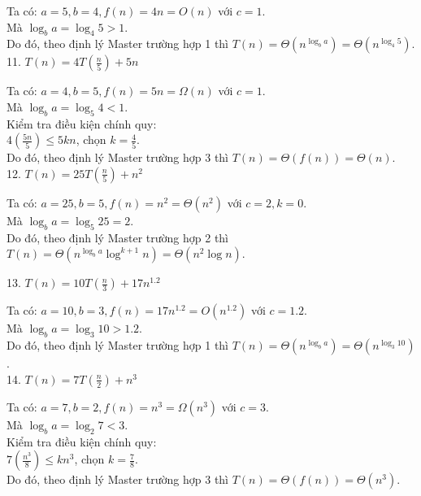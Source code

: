 \documentclass[12pt, a4paper, fleqn]{article}
\begin{document}
		Ta có: $a = 5, b = 4, f(n) = 4n = O (n)$ với $c = 1$.\\
		Mà $\log_{b} a = \log_{4} 5 > 1$.\\
		Do đó, theo định lý Master trường hợp 1 thì $T(n) = \Theta \left( n^{\log_{b} a} \right) = \Theta (n^{\log_{4} 5})$.
		\\
		
		11. $\displaystyle
		T(n) = 4T\left( \frac{n}{5} \right) + 5n$
		
		Ta có: $a = 4, b = 5, f(n) = 5n = \Omega (n)$ với $c = 1$.\\
		Mà $\log_{b} a = \log_{5} 4 < 1$.\\
		Kiểm tra điều kiện chính quy:\\
		$\displaystyle
		4 \left( \frac{5n}{5} \right) \leq 5kn$, chọn $\displaystyle
		k = \frac{4}{5}$.\\
		Do đó, theo định lý Master trường hợp 3 thì $T(n) = \Theta (f(n)) = \Theta (n)$.
		\\
		
		12. $\displaystyle
		T(n) = 25T\left( \frac{n}{5} \right) + n^2$
		
		Ta có: $a = 25, b = 5, f(n) = n^2 = \Theta (n^2)$ với $c = 2, k = 0$.\\
		Mà $\log_{b} a = \log_{5} 25 = 2$.\\
		Do đó, theo định lý Master trường hợp 2 thì $T(n) = \Theta \left( n^{\log_{b} a} \log^{k + 1} n \right) = \Theta (n^2\log n)$.
		\clearpage
		
		13. $\displaystyle
		T(n) = 10T\left( \frac{n}{3} \right) + 17n^{1.2}$
		
		Ta có: $a = 10, b = 3, f(n) = 17n^{1.2} = O (n^{1.2})$ với $c = 1.2$.\\
		Mà $\log_{b} a = \log_{3} 10 > 1.2$.\\
		Do đó, theo định lý Master trường hợp 1 thì $T(n) = \Theta \left( n^{\log_{b} a} \right) = \Theta (n^{\log_{3} 10})$.
		\\
		
		14. $\displaystyle
		T(n) = 7T\left( \frac{n}{2} \right) + n^3$
		
		Ta có: $a = 7, b = 2, f(n) = n^3 = \Omega (n^3)$ với $c = 3$.\\
		Mà $\log_{b} a = \log_{2} 7 < 3$.\\
		Kiểm tra điều kiện chính quy:\\
		$\displaystyle
		7 \left( \frac{n^3}{8} \right) \leq kn^3$, chọn $\displaystyle
		k = \frac{7}{8}$.\\
		Do đó, theo định lý Master trường hợp 3 thì $T(n) = \Theta (f(n)) = \Theta (n^3)$.
		\\
		
\end{document}
